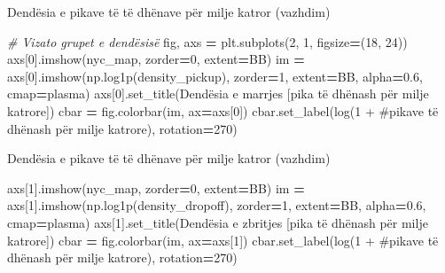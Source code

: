 \documentclass[
  ignorenonframetext,
]{beamer}
\newenvironment{Shaded}{\begin{snugshade}}{\end{snugshade}}
\newcommand{\CommentTok}[1]{\textcolor[rgb]{0.56,0.35,0.01}{\textit{#1}}}
\newcommand{\DecValTok}[1]{\textcolor[rgb]{0.00,0.00,0.81}{#1}}
\newcommand{\FloatTok}[1]{\textcolor[rgb]{0.00,0.00,0.81}{#1}}
\newcommand{\NormalTok}[1]{#1}
\newcommand{\OperatorTok}[1]{\textcolor[rgb]{0.81,0.36,0.00}{\textbf{#1}}}
\newcommand{\StringTok}[1]{\textcolor[rgb]{0.31,0.60,0.02}{#1}}
\begin{document}
\begin{frame}[fragile]{Dendësia e pikave të të dhënave për milje katror
(vazhdim)}
\begin{Shaded}
\begin{Highlighting}[]
\CommentTok{\# Vizato grupet e dendësisë}
\NormalTok{fig, axs }\OperatorTok{=}\NormalTok{ plt.subplots(}\DecValTok{2}\NormalTok{, }\DecValTok{1}\NormalTok{, figsize}\OperatorTok{=}\NormalTok{(}\DecValTok{18}\NormalTok{, }\DecValTok{24}\NormalTok{))}
\NormalTok{axs[}\DecValTok{0}\NormalTok{].imshow(nyc\_map, zorder}\OperatorTok{=}\DecValTok{0}\NormalTok{, extent}\OperatorTok{=}\NormalTok{BB)}
\NormalTok{im }\OperatorTok{=}\NormalTok{ axs[}\DecValTok{0}\NormalTok{].imshow(np.log1p(density\_pickup), zorder}\OperatorTok{=}\DecValTok{1}\NormalTok{, extent}\OperatorTok{=}\NormalTok{BB, alpha}\OperatorTok{=}\FloatTok{0.6}\NormalTok{, cmap}\OperatorTok{=}\StringTok{\textquotesingle{}plasma\textquotesingle{}}\NormalTok{)}
\NormalTok{axs[}\DecValTok{0}\NormalTok{].set\_title(}\StringTok{\textquotesingle{}Dendësia e marrjes [pika të dhënash për milje katrore]\textquotesingle{}}\NormalTok{)}
\NormalTok{cbar }\OperatorTok{=}\NormalTok{ fig.colorbar(im, ax}\OperatorTok{=}\NormalTok{axs[}\DecValTok{0}\NormalTok{])}
\NormalTok{cbar.set\_label(}\StringTok{\textquotesingle{}log(1 + \#pikave të dhënash për milje katrore)\textquotesingle{}}\NormalTok{, rotation}\OperatorTok{=}\DecValTok{270}\NormalTok{)}
\end{Highlighting}
\end{Shaded}
\end{frame}

\begin{frame}[fragile]{Dendësia e pikave të të dhënave për milje katror
(vazhdim)}
\protect\hypertarget{denduxebsia-e-pikave-tuxeb-tuxeb-dhuxebnave-puxebr-milje-katror-vazhdim-2}{}

\begin{Shaded}
\begin{Highlighting}[]
\NormalTok{axs[}\DecValTok{1}\NormalTok{].imshow(nyc\_map, zorder}\OperatorTok{=}\DecValTok{0}\NormalTok{, extent}\OperatorTok{=}\NormalTok{BB)}
\NormalTok{im }\OperatorTok{=}\NormalTok{ axs[}\DecValTok{1}\NormalTok{].imshow(np.log1p(density\_dropoff), zorder}\OperatorTok{=}\DecValTok{1}\NormalTok{, extent}\OperatorTok{=}\NormalTok{BB, alpha}\OperatorTok{=}\FloatTok{0.6}\NormalTok{, cmap}\OperatorTok{=}\StringTok{\textquotesingle{}plasma\textquotesingle{}}\NormalTok{)}
\NormalTok{axs[}\DecValTok{1}\NormalTok{].set\_title(}\StringTok{\textquotesingle{}Dendësia e zbritjes [pika të dhënash për milje katrore]\textquotesingle{}}\NormalTok{)}
\NormalTok{cbar }\OperatorTok{=}\NormalTok{ fig.colorbar(im, ax}\OperatorTok{=}\NormalTok{axs[}\DecValTok{1}\NormalTok{])}
\NormalTok{cbar.set\_label(}\StringTok{\textquotesingle{}log(1 + \#pikave të dhënash për milje katrore)\textquotesingle{}}\NormalTok{, rotation}\OperatorTok{=}\DecValTok{270}\NormalTok{)}
\end{Highlighting}
\end{Shaded}
\end{frame}
\end{document}
